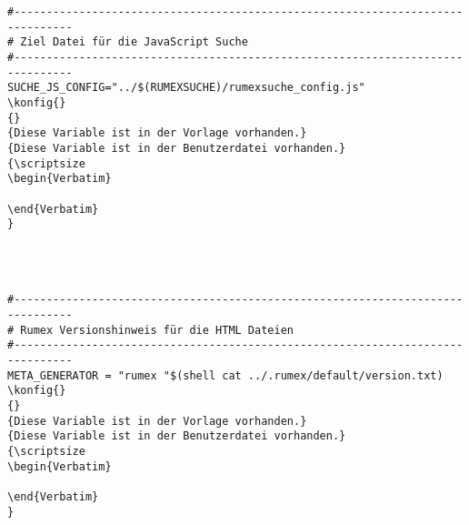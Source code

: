 \begin{verbatim}
#-------------------------------------------------------------------------------
# Ziel Datei für die JavaScript Suche
#-------------------------------------------------------------------------------
SUCHE_JS_CONFIG="../$(RUMEXSUCHE)/rumexsuche_config.js"
\konfig{}
{}
{Diese Variable ist in der Vorlage vorhanden.}
{Diese Variable ist in der Benutzerdatei vorhanden.}
{\scriptsize
\begin{Verbatim}

\end{Verbatim}
}




#-------------------------------------------------------------------------------
# Rumex Versionshinweis für die HTML Dateien
#-------------------------------------------------------------------------------
META_GENERATOR = "rumex "$(shell cat ../.rumex/default/version.txt)
\konfig{}
{}
{Diese Variable ist in der Vorlage vorhanden.}
{Diese Variable ist in der Benutzerdatei vorhanden.}
{\scriptsize
\begin{Verbatim}

\end{Verbatim}
}

\end{verbatim}
